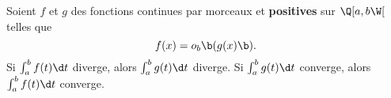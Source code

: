 \medskip
\Theoreme 
[$a\in\ob R$ et $b>a$ \'el\'ement de $\ol R$]
Soient  $f$ et $g$ des fonctions continues par morceaux et {\bf positives} sur $\Q[a,b\W[$ telles que 
$$
f(x)=o_b\b(g(x)\b).
$$ 
Si $\int_a^b f(t)\d t$ diverge, alors $\int_a^bg(t)\d t$ diverge. \pn
Si $\int_a^b g(t)\d t$ converge, alors $\int_a^bf(t)\d t$ converge.  

\eject


\vglue-10mm

\bigskip\bigskip
{}
\vfill
{}
\vfill
{}
\vfill
{}
\vfill
{}
\vfill
{}
\vfill
{}
\vfill
{}
\vfill
{}
\vfill
{}
\vfill
{}
\vfill
{}
\vfill
{}


\bye